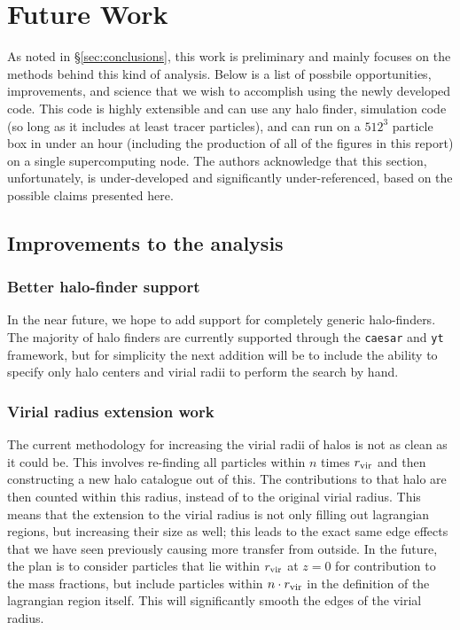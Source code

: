 \section{Future Work}
\label{sec:futurework}

As noted in \S \ref{sec:conclusions}, this work is preliminary and mainly
focuses on the methods behind this kind of analysis. Below is a list of
possbile opportunities, improvements, and science that we wish to accomplish
using the newly developed \ltcaesar{} code. This code is highly extensible and
can use any halo finder, simulation code (so long as it includes at least
tracer particles), and can run on a $512^3$ particle box in under an hour
(including the production of all of the figures in this report) on a single
supercomputing node. The authors acknowledge that this section, unfortunately,
is under-developed and significantly under-referenced, based on the possible
claims presented here.

\subsection{Improvements to the analysis}

\subsubsection{Better halo-finder support}

In the near future, we hope to add support for completely generic halo-finders.
The majority of halo finders are currently supported through the {\tt caesar}
and {\tt yt} framework, but for simplicity the next addition will be to
include the ability to specify only halo centers and virial radii to perform
the search by hand.

\subsubsection{Virial radius extension work}

The current methodology for increasing the virial radii of halos is not as
clean as it could be. This involves re-finding all particles within $n$ times
$r_{\rm vir}$ and then constructing a new halo catalogue out of this. The
contributions to that halo are then counted within this radius, instead of
to the original virial radius. This means that the extension to the virial
radius is not only filling out lagrangian regions, but increasing their
size as well; this leads to the exact same edge effects that we have seen
previously causing more transfer from outside. In the future, the plan is to
consider particles that lie within $r_{\rm vir}$ at $z=0$ for contribution
to the mass fractions, but include particles within $n \cdot r_{\rm vir}$
in the definition of the lagrangian region itself. This will significantly
smooth the edges of the virial radius.

